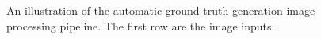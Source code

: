 \begin{figure}[h]
    \qquad
    \qquad
    \qquad
    \caption{An illustration of the automatic ground truth generation image processing pipeline. The first row are the image inputs.}%
    \label{fig:ground_truth_pipeline_example}%
\end{figure}
